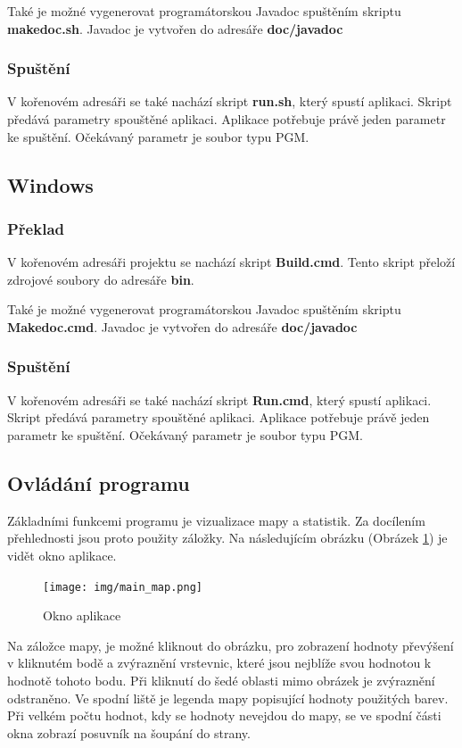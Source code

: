 \documentclass[12pt]{report}
\begin{document}
Také je možné vygenerovat programátorskou Javadoc spuštěním skriptu \textbf{makedoc.sh}. Javadoc je 
vytvořen do adresáře \textbf{doc/javadoc}
%
\subsubsection{Spuštění}
V kořenovém adresáři se také nachází skript \textbf{run.sh}, který spustí aplikaci. Skript předává parametry
spouštěné aplikaci. Aplikace potřebuje právě jeden parametr ke spuštění. Očekávaný parametr je soubor 
typu PGM.
%
\subsection{Windows}
\subsubsection{Překlad}
V kořenovém adresáři projektu se nachází skript \textbf{Build.cmd}. Tento skript přeloží zdrojové soubory
do adresáře \textbf{bin}.

Také je možné vygenerovat programátorskou Javadoc spuštěním skriptu \textbf{Makedoc.cmd}. Javadoc je 
vytvořen do adresáře \textbf{doc/javadoc}
%
\subsubsection{Spuštění}
V kořenovém adresáři se také nachází skript \textbf{Run.cmd}, který spustí aplikaci. Skript předává parametry
spouštěné aplikaci. Aplikace potřebuje právě jeden parametr ke spuštění. Očekávaný parametr je soubor 
typu PGM.
\subsection{Ovládání programu}
Základními funkcemi programu je vizualizace mapy a statistik. Za docílením přehlednosti jsou proto použity
záložky. Na následujícím obrázku (Obrázek \ref{img:app_win}) je vidět okno aplikace.

\begin{figure}[H]
	\centering
	\texttt{[image: img/main\_map.png]}
	\caption{Okno aplikace}
	\label{img:app_win}
\end{figure}

Na záložce mapy, je možné kliknout do obrázku, pro zobrazení hodnoty převýšení v kliknutém bodě a zvýraznění
vrstevnic, které jsou nejblíže svou hodnotou k hodnotě tohoto bodu. Při kliknutí do šedé oblasti mimo obrázek
je zvýraznění odstraněno. Ve spodní liště je legenda mapy popisující hodnoty použitých barev. Při velkém
počtu hodnot, kdy se hodnoty nevejdou do mapy, se ve spodní části okna zobrazí posuvník na šoupání do strany.
\end{document}
